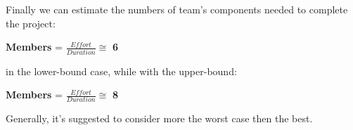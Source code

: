 Finally we can estimate the numbers of team's components needed to complete the project:
\begin{center}\textbf{Members} = $\frac{Effort}{Duration} \cong$ \textbf{6}\end{center}
in the lower-bound case, while with the upper-bound:
\begin{center}\textbf{Members} = $\frac{Effort}{Duration} \cong$ \textbf{8}\end{center}
Generally, it's suggested to consider more the worst case then the best.
